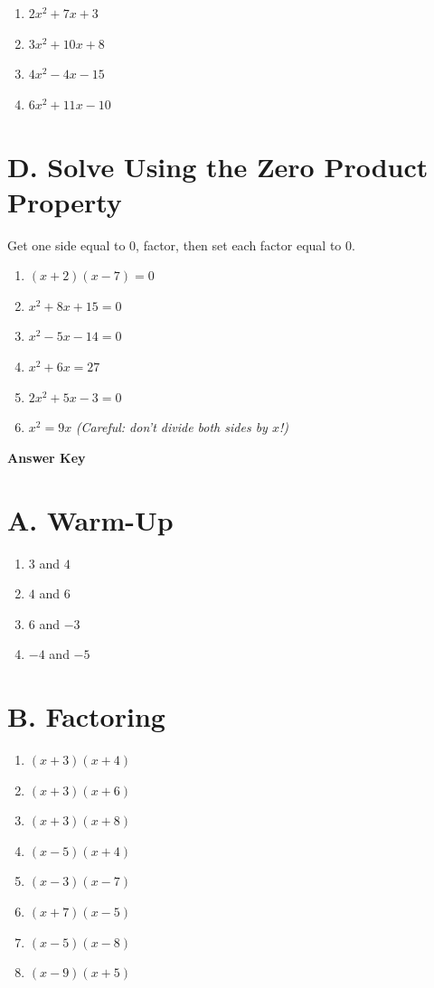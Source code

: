 \documentclass[12pt]{article}
\begin{document}
\begin{enumerate}[itemsep=2.8cm]
  \item $2x^2 + 7x + 3$
  \item $3x^2 + 10x + 8$
  \item $4x^2 - 4x - 15$
  \item $6x^2 + 11x - 10$
\end{enumerate}

\section*{D. Solve Using the Zero Product Property}
Get one side equal to $0$, factor, then set each factor equal to $0$.

\begin{enumerate}[itemsep=2.6cm]
  \item $(x+2)(x-7) = 0$
  \item $x^2 + 8x + 15 = 0$
  \item $x^2 - 5x - 14 = 0$
  \item $x^2 + 6x = 27$
  \item $2x^2 + 5x - 3 = 0$
  \item $x^2 = 9x$ \quad \emph{(Careful: don't divide both sides by $x$!)}
\end{enumerate}

\newpage

\begin{center}
  {\Large\bfseries Answer Key}
\end{center}

\section*{A. Warm-Up}
\begin{enumerate}[itemsep=2pt]
  \item $3$ and $4$
  \item $4$ and $6$
  \item $6$ and $-3$
  \item $-4$ and $-5$
\end{enumerate}

\section*{B. Factoring}
\begin{enumerate}[itemsep=2pt]
  \item $(x+3)(x+4)$
  \item $(x+3)(x+6)$
  \item $(x+3)(x+8)$
  \item $(x-5)(x+4)$
  \item $(x-3)(x-7)$
  \item $(x+7)(x-5)$
  \item $(x-5)(x-8)$
  \item $(x-9)(x+5)$
\end{enumerate}
\end{document}
